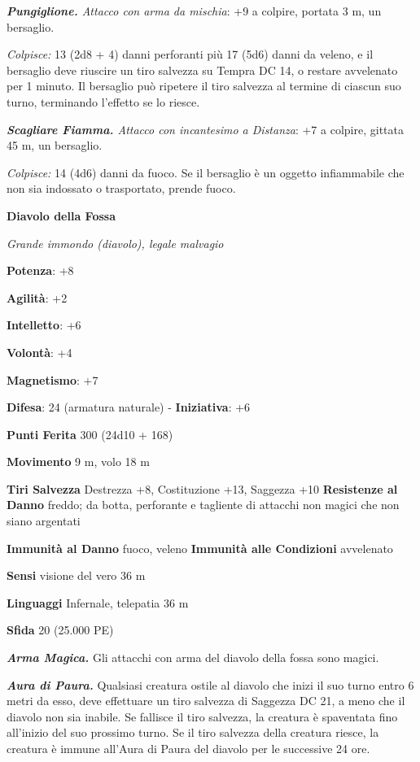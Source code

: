 \begin{multicols}{2}
\emph{\textbf{Pungiglione.} Attacco con arma da mischia}: +9 a colpire,
portata 3 m, un bersaglio.

\emph{Colpisce:} 13 (2d8 + 4) danni perforanti più 17 (5d6) danni da
veleno, e il bersaglio deve riuscire un tiro salvezza su Tempra DC
14, o restare avvelenato per 1 minuto. Il bersaglio può ripetere il tiro
salvezza al termine di ciascun suo turno, terminando l'effetto se lo
riesce.

\emph{\textbf{Scagliare Fiamma.} Attacco con incantesimo a Distanza}: +7
a colpire, gittata 45 m, un bersaglio.

\emph{Colpisce:} 14 (4d6) danni da fuoco. Se il bersaglio è un oggetto
infiammabile che non sia indossato o trasportato, prende fuoco.

\textbf{Diavolo della Fossa}

\emph{Grande immondo (diavolo), legale malvagio}

\textbf{Potenza}: +8

\textbf{Agilità}: +2

\textbf{Intelletto}: +6

\textbf{Volontà}: +4

\textbf{Magnetismo}: +7

\textbf{Difesa}: 24 (armatura naturale) - \textbf{Iniziativa}: +6

\textbf{Punti Ferita} 300 (24d10 + 168)

\textbf{Movimento} 9 m, volo 18 m

\textbf{Tiri Salvezza} Destrezza +8, Costituzione +13, Saggezza +10
\textbf{Resistenze al Danno} freddo; da botta, perforante e tagliente
di attacchi non magici che non siano argentati

\textbf{Immunità al Danno} fuoco, veleno \textbf{Immunità alle
Condizioni} avvelenato

\textbf{Sensi} visione del vero 36 m

\textbf{Linguaggi} Infernale, telepatia 36 m 

\textbf{Sfida} 20 (25.000 PE)\smallskip

\emph{\textbf{Arma Magica.}} Gli attacchi con arma del diavolo della
fossa sono magici.

\emph{\textbf{Aura di Paura.}} Qualsiasi creatura ostile al diavolo che
inizi il suo turno entro 6 metri da esso, deve effettuare un tiro
salvezza di Saggezza DC 21, a meno che il diavolo non sia inabile. Se
fallisce il tiro salvezza, la creatura è spaventata fino all'inizio del
suo prossimo turno. Se il tiro salvezza della creatura riesce, la
creatura è immune all'Aura di Paura del diavolo per le successive 24
ore.


\end{multicols}
